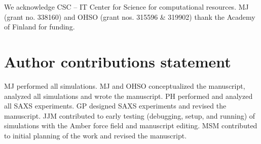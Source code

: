 \documentclass[journal=jctcce]{achemso}
\begin{document}
\begin{acknowledgement}
We acknowledge CSC -- IT Center for Science for computational resources.
%
MJ (grant no. 338160) and OHSO (grant nos. 315596 \& 319902) thank the Academy of Finland for funding.

\end{acknowledgement}

\section*{Author contributions statement}

MJ performed all simulations. MJ and OHSO conceptualized the manuscript, analyzed all simulations and wrote the manuscript. PH performed and analyzed all SAXS experiments. GP designed SAXS experiments and revised the manuscript. JJM contributed to early testing (debugging, setup, and running) of simulations with the Amber force field and manuscript editing. MSM contributed to initial planning of the work and revised the manuscript.


\end{document}
